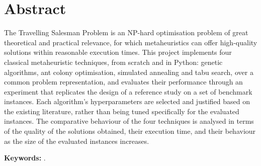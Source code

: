 %
%
%
% 
%
%
%
%

\chapter*{Abstract}
\label{cha:abstract}


The Travelling Salesman Problem is an NP-hard optimisation problem of great theoretical and practical relevance,
for which metaheuristics can offer high-quality solutions within reasonable execution times. This project implements 
four classical metaheuristic techniques, from scratch and in Python: genetic algorithms, ant colony optimisation, 
simulated annealing and tabu search, over a common problem representation, and evaluates their performance through an
experiment that replicates the design of a reference study on a set of benchmark instances. Each algorithm's 
hyperparameters are selected and justified based on the existing literature, rather than being tuned specifically for 
the evaluated instances. The comparative behaviour of the four techniques is analysed in terms of the quality of the
solutions obtained, their execution time, and their behaviour as the size of the evaluated instances increases.

\textbf{Keywords:} \myThesisKeywordsEnglish.



